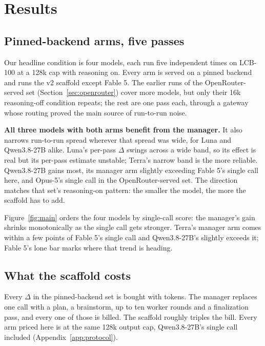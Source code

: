 \documentclass{article}
\begin{document}
\section{Results}
\label{sec:results}

\subsection{Pinned-backend arms, five passes}
\label{sec:pinned}



Our headline condition is four models, each run five independent times on LCB-100 at a 128k
cap with reasoning on. Every arm is served on a pinned backend and runs the v2 scaffold except Fable 5. The
earlier runs of the OpenRouter-served set (Section~\ref{sec:openrouter}) cover more models,
but only their 16k reasoning-off condition repeats; the rest are one pass each, through a
gateway whose routing proved the main source of run-to-run noise.

\textbf{All three models with both arms benefit from the manager.} It also narrows
run-to-run spread wherever that spread was wide, for Luna and Qwen3.8-27B alike. Luna's
per-pass $\Delta$ swings across a wide band, so its effect is real but its per-pass estimate
unstable; Terra's narrow band is the more reliable. Qwen3.8-27B gains most, its manager arm
slightly exceeding Fable 5's single call here, and Opus-5's single call in the OpenRouter-served
set. The
direction matches that set's reasoning-on pattern: the smaller the model, the more the
scaffold has to add.

Figure~\ref{fig:main} orders the four models by single-call score: the manager's gain shrinks
monotonically as the single call gets stronger. Terra's manager arm comes within a few points of
Fable 5's single call and Qwen3.8-27B's slightly exceeds it; Fable 5's lone bar marks where that
trend is heading.

\subsection{What the scaffold costs}
\label{sec:cost}

Every $\Delta$ in the pinned-backend set is bought with tokens. The manager replaces one call
with a plan, a brainstorm, up to ten worker rounds and a finalization pass, and every one of
those is billed. The scaffold roughly triples the bill. Every arm
priced here is at the same 128k output cap, Qwen3.8-27B's single call included
(Appendix~\ref{app:protocol}).
\end{document}

